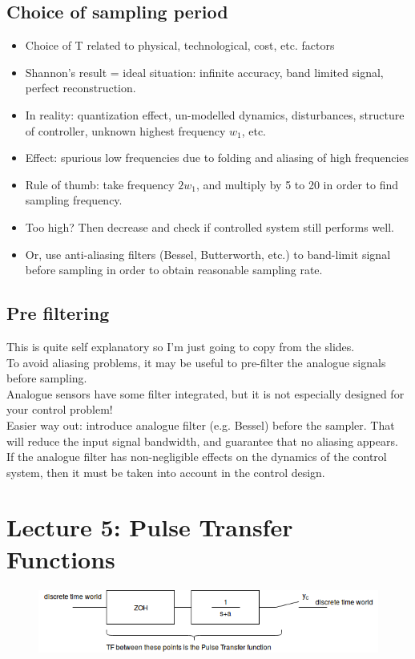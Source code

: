 \documentclass[a4paper,11pt]{article}
\begin{document}
	\subsection{Choice of sampling period}
	\begin{itemize}   
		\item Choice of T related to physical, technological, cost, etc. factors
		\item Shannon's result = ideal situation: infinite accuracy, band limited signal, perfect reconstruction.
		\item In reality: quantization effect, un-modelled dynamics, disturbances, structure of controller, unknown highest frequency $w_1$, etc.
		\item Effect: spurious low frequencies due to folding and aliasing of high frequencies
		\item Rule of thumb: take frequency $2w_1$, and multiply by 5 to 20 in order to find sampling frequency.
		\item Too high? Then decrease and check if controlled system still performs well.
		\item Or, use anti-aliasing filters (Bessel, Butterworth, etc.) to band-limit signal before sampling in order to obtain reasonable sampling rate.
	\end{itemize}
	
	\subsection{Pre filtering} 
	This is quite self explanatory so I'm just going to copy from the slides.\\	To avoid aliasing problems, it may be useful to
pre-filter the analogue signals before sampling.\\
	Analogue sensors have some filter integrated, but it is
not especially designed for your control problem!\\
Easier way out: introduce analogue filter (e.g. Bessel)
before the sampler. That will reduce the input signal
bandwidth, and guarantee that no aliasing appears.\\
If the analogue filter has non-negligible effects on the
dynamics of the control system, then it must be taken
into account in the control design.\\
	\section{Lecture 5: Pulse Transfer Functions} 
	\begin{figure}[htp]
		\centering
		\includegraphics[scale=0.6]{images/PTF}
	\end{figure}
	\FloatBarrier
	
\end{document}
